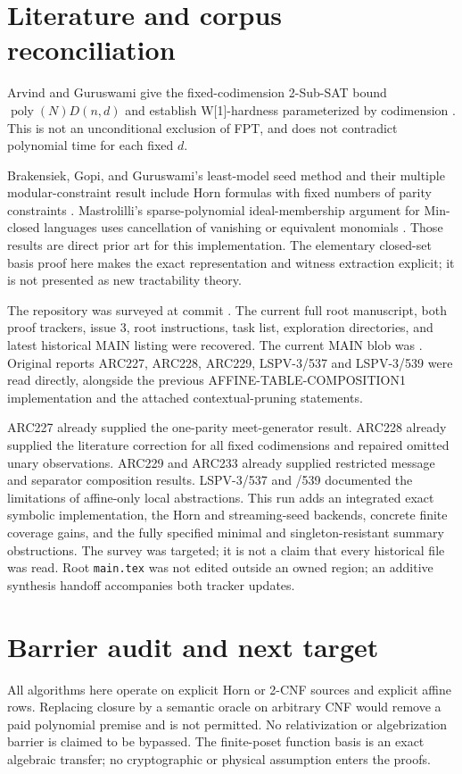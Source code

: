 \documentclass[11pt]{article}
\begin{document}
\section{Literature and corpus reconciliation}
Arvind and Guruswami give the fixed-codimension 2-Sub-SAT bound
\(\operatorname{poly}(N)D(n,d)\) and establish W[1]-hardness parameterized
by codimension \cite{arvind2021}. This is not an unconditional exclusion
of FPT, and does not contradict polynomial time for each fixed \(d\).

Brakensiek, Gopi, and Guruswami's least-model seed method and their
multiple modular-constraint result include Horn formulas with fixed
numbers of parity constraints \cite{brakensiek2019}.
Mastrolilli's sparse-polynomial ideal-membership argument for Min-closed
languages uses cancellation of vanishing or equivalent monomials
\cite{mastrolilli2019}. Those results are direct prior art for this
implementation. The elementary closed-set basis proof here makes
the exact representation and witness extraction explicit; it is not
presented as new tractability theory.

The repository was surveyed at commit
.
The current full root manuscript, both proof trackers, issue 3, root
instructions, task list, exploration directories, and latest historical
MAIN listing were recovered. The current MAIN blob was
.
Original reports ARC227, ARC228, ARC229, LSPV-3/537 and LSPV-3/539
were read directly, alongside the previous AFFINE-TABLE-COMPOSITION1
implementation and the attached contextual-pruning statements.

ARC227 already supplied the one-parity meet-generator result.
ARC228 already supplied the literature correction for all fixed
codimensions and repaired omitted unary observations.
ARC229 and ARC233 already supplied restricted message and separator
composition results. LSPV-3/537 and /539 documented the limitations of
affine-only local abstractions.
This run adds an integrated exact symbolic implementation, the Horn
and streaming-seed backends, concrete finite coverage gains, and the
fully specified minimal and singleton-resistant summary obstructions.
The survey was targeted; it is not a claim that every historical file
was read. Root \texttt{main.tex} was not edited outside an owned region;
an additive synthesis handoff accompanies both tracker updates.

\section{Barrier audit and next target}
All algorithms here operate on explicit Horn or 2-CNF sources and
explicit affine rows. Replacing closure by a semantic oracle on arbitrary
CNF would remove a paid polynomial premise and is not permitted.
No relativization or algebrization barrier is claimed to be bypassed.
The finite-poset function basis is an exact algebraic transfer; no
cryptographic or physical assumption enters the proofs.
\end{document}
